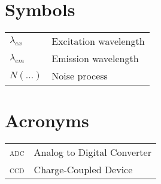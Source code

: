 \section*{Symbols}

\begin{longtable}{ll}
$\lambda_{ex}$  &       Excitation wavelength\\
$\lambda_{em}$  &	Emission wavelength\\
$N(\ldots)$	&	Noise process\\
\end{longtable}

\section*{Acronyms}

\begin{longtable}{ll}
\textsc{adc}	& Analog to Digital Converter\\
\textsc{ccd}	& Charge-Coupled Device\\
\end{longtable}
